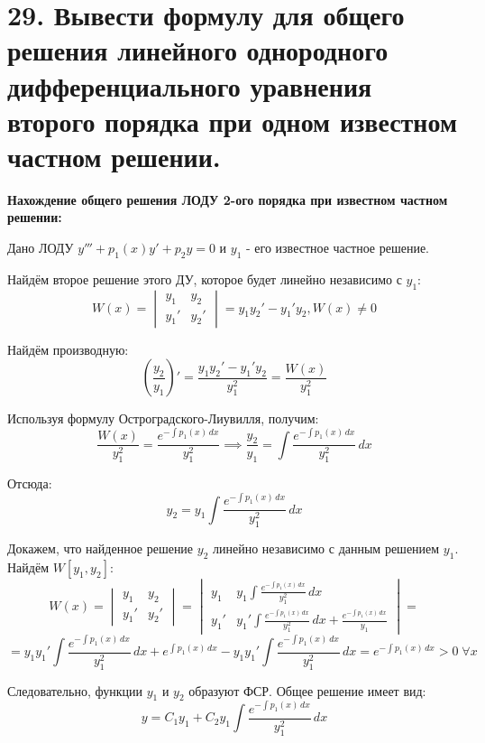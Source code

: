 \documentclass[11pt]{article}
\begin{document}
\section*{29. Вывести формулу для общего решения линейного однородного дифференциального уравнения второго порядка при одном известном частном решении.}
\par\textbf{Нахождение общего решения ЛОДУ 2-ого порядка при известном частном решении:}
\par Дано ЛОДУ $y''' + p_{1}(x)y' + p_{2}y = 0$ и $y_{1}$ - его известное частное решение.
\par Найдём второе решение этого ДУ, которое будет линейно независимо с $y_{1}$:
$$W(x) = \begin{vmatrix}
y_{1} & y_{2}  \\
y_{1}' & y_{2}'
\end{vmatrix} = y_{1}y_{2}' - y_{1}'y_{2}, W(x) \neq 0$$
\par Найдём производную:
$$\left( \frac{y_{2}}{y_{1}} \right)' = \frac{y_{1}y_{2}' - y_{1}'y_{2}}{y_{1}^2} = \frac{W(x)}{y_{1}^2}$$
\par Используя формулу Остроградского-Лиувилля, получим:
$$\frac{W(x)}{y_{1}^2} = \frac{e^{-\int p_{1}(x) \, dx }}{y_{1}^2} \implies \frac{y_{2}}{y_{1}} = \int \frac{e^{-\int p_{1}(x) \, dx }}{y_{1}^2} \, dx$$
\par Отсюда:$$y_{2} = y_{1} \int \frac{e^{-\int p_{1}(x) \, dx }}{y_{1}^2} \, dx$$
\par Докажем, что найденное решение $y_{2}$ линейно независимо с данным решением $y_{1}$. Найдём $W[y_{1}, y_{2}]$:
$$W(x) = \begin{vmatrix}
y_{1} & y_{2}  \\
y_{1}' & y_{2}'
\end{vmatrix} = 
\begin{vmatrix}
y_{1} & y_{1} \int \frac{e^{-\int p_{1}(x) \, dx }}{y_{1}^2} \, dx   \\
y_{1}' & y_{1}'\int \frac{e^{-\int p_{1}(x) \, dx }}{y_{1}^2} \, dx + \frac{e^{-\int p_{1}(x) \, dx }}{y_{1}} 
\end{vmatrix} =$$
$$= y_{1}y_{1}'\int \frac{e^{-\int p_{1}(x) \, dx }}{y_{1}^2} \, dx + e^{\int p_{1}(x) \, dx } - y_{1}y_{1}'\int \frac{e^{-\int p_{1}(x) \, dx }}{y_{1}^2} \, dx = e^{-\int p_{1}(x) \, dx} > 0 \; \forall x$$
\par Следовательно, функции $y_{1}$ и $y_{2}$ образуют ФСР. Общее решение имеет вид:
$$y=C_{1}y_{1} + C_{2}y_{1}\int \frac{e^{-\int p_{1}(x) \, dx }}{y_{1}^2} \, dx $$
\end{document}
